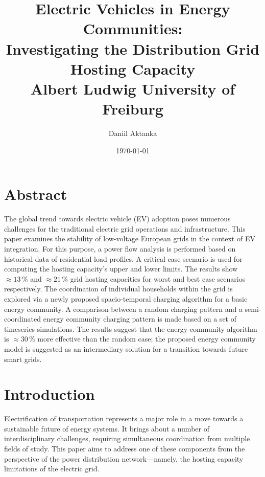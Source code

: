 \documentclass[a4paper,10pt]{report}
\begin{document}
\title{
	\vspace{2cm}
	{\LARGE Electric Vehicles in Energy Communities:}\\
	{\Large Investigating the Distribution Grid Hosting Capacity} \\[2cm]
	{\large Albert Ludwig University of Freiburg}
}
\author{
	\Large Daniil Aktanka
}
\date{
	\normalsize \today
}
\maketitle
\thispagestyle{empty}


\chapter*{Abstract}

The global trend towards electric vehicle (EV) adoption poses numerous challenges for the traditional electric grid operations and infrastructure. This paper examines the stability of low-voltage European grids in the context of EV integration. For this purpose, a power flow analysis is performed based on historical data of residential load profiles. A critical case scenario is used for computing the hosting capacity's upper and lower limits. The results show $\approx 13\,\%$ and $\approx 21\,\%$ grid hosting capacities for worst and best case scenarios respectively. The coordination of individual households within the grid is explored via a newly proposed spacio-temporal charging algorithm for a basic energy community.  A comparison between a random charging pattern and a semi-coordinated energy community charging pattern is made based on a set of timeseries simulations. The results suggest that the energy community algorithm is $\approx 30\,\%$ more effective than the random case; the proposed energy community model is suggested as an intermediary solution for a transition towards future smart grids.


\listoftables
{}
\cleardoublepage

\listoffigures
{}
\cleardoublepage

\tableofcontents\cleardoublepage



\chapter{Introduction}
Electrification of transportation represents a major role in a move towards a sustainable future of energy systems. It brings about a number of interdisciplinary challenges, requiring simultaneous coordination from multiple fields of study. This paper aims to address one of these components from the perspective of the power distribution network---namely, the hosting capacity limitations of the electric grid.
\end{document}
